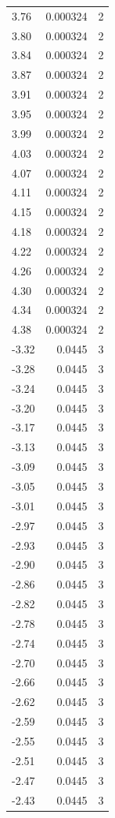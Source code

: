 \begin{longtable}{lrr}
  3.76 & 0.000324 & 2 \\
  3.80 & 0.000324 & 2 \\
  3.84 & 0.000324 & 2 \\
  3.87 & 0.000324 & 2 \\
  3.91 & 0.000324 & 2 \\
  3.95 & 0.000324 & 2 \\
  3.99 & 0.000324 & 2 \\
  4.03 & 0.000324 & 2 \\
  4.07 & 0.000324 & 2 \\
  4.11 & 0.000324 & 2 \\
  4.15 & 0.000324 & 2 \\
  4.18 & 0.000324 & 2 \\
  4.22 & 0.000324 & 2 \\
  4.26 & 0.000324 & 2 \\
  4.30 & 0.000324 & 2 \\
  4.34 & 0.000324 & 2 \\
  4.38 & 0.000324 & 2 \\
  -3.32 & 0.0445 & 3 \\
  -3.28 & 0.0445 & 3 \\
  -3.24 & 0.0445 & 3 \\
  -3.20 & 0.0445 & 3 \\
  -3.17 & 0.0445 & 3 \\
  -3.13 & 0.0445 & 3 \\
  -3.09 & 0.0445 & 3 \\
  -3.05 & 0.0445 & 3 \\
  -3.01 & 0.0445 & 3 \\
  -2.97 & 0.0445 & 3 \\
  -2.93 & 0.0445 & 3 \\
  -2.90 & 0.0445 & 3 \\
  -2.86 & 0.0445 & 3 \\
  -2.82 & 0.0445 & 3 \\
  -2.78 & 0.0445 & 3 \\
  -2.74 & 0.0445 & 3 \\
  -2.70 & 0.0445 & 3 \\
  -2.66 & 0.0445 & 3 \\
  -2.62 & 0.0445 & 3 \\
  -2.59 & 0.0445 & 3 \\
  -2.55 & 0.0445 & 3 \\
  -2.51 & 0.0445 & 3 \\
  -2.47 & 0.0445 & 3 \\
  -2.43 & 0.0445 & 3 \\

\end{longtable}
